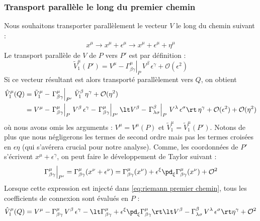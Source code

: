 \subsubsection{Transport parallèle le long du premier chemin}
Nous souhaitons transporter parallèlement le vecteur $V$ le long du chemin suivant :
\begin{align}
        x^\mu \rightarrow x^\mu+\epsilon^\mu \rightarrow  x^\mu + \epsilon^\mu + \eta^\mu
\end{align}
Le transport parallèle de $V$ de $P$ vers $P'$ est par définition :
\begin{equation}
    \tilde{V}^\mu_1 (P') = V^\mu - \left. \Gamma^\mu_{\beta \gamma}\right|_P \, V^\beta \, \epsilon^\gamma + \mathcal{O}(\epsilon^2)
\end{equation}
Si ce vecteur résultant est alors transporté parallèlement vers $Q$, on obtient 
\begin{align}
    \hat{V}^\mu_1 (Q) &= \tilde{V}^\mu_1 - \left. \Gamma^\mu_{\beta \gamma} \right|_{P'} \, \tilde{V}^\beta_1 \,  \eta^\gamma + \mathcal{O}(\eta^2)\\
    \label{eq:riemann premier chemin}
    & = V^\mu - \left. \Gamma^\mu_{\beta \gamma} \right|_P \, V^\beta \, \epsilon^\gamma - \left. \Gamma^\mu_{\beta \gamma} \right|_{P'} \lt V^\beta -\left. \Gamma^\beta_{\lambda \sigma}\right|_P \, V^\lambda \, \epsilon^\sigma \rt \, \eta^\gamma +  \mathcal{O}(\epsilon^2) + \mathcal{O}(\eta^2)
\end{align}
où nous avons omis les arguments : $V^\mu = V^\mu(P)$ et $\tilde{V}^\mu_1 = \tilde{V}^\mu_1 (P')$. Notons de plus que nous négligerons les termes de second ordre mais pas les termes croisées en $\epsilon \eta$ (qui s'avérera crucial pour notre analyse). Comme, les coordonnées de $P'$ s'écrivent $x^\mu + \epsilon^\gamma$, on peut faire le développement de Taylor suivant :
\begin{equation}
    \label{eq:taylor connexion}
    \left. \Gamma^\mu_{\beta \gamma} \right|_{P'} = \Gamma^\mu_{\beta \gamma} (x^\nu +\epsilon^\nu ) = \Gamma^\mu_{\beta \gamma} (x^\nu) + \epsilon^\xi \pd_\xi \Gamma^\mu_{\beta \gamma} (x^\nu) + \mathcal{O}^2
\end{equation}
Lorsque cette expression est injecté dans \ref{eq:riemann premier chemin}, tous les coefficients de connexion sont évalués en $P$ :
\begin{equation}
    \label{eq: premier chemin}
    \hat{V}^\mu_1 (Q) = V^\mu - \Gamma^\mu_{\beta \gamma}  \, V^\beta \, \epsilon^\gamma - \lt \Gamma^\mu_{\beta \gamma} + \epsilon^\xi \pd_\xi \Gamma^\mu_{\beta \gamma} \rt \lt V^\beta - \Gamma^\beta_{\lambda \sigma} \, V^\lambda \, \epsilon^\sigma \rt \eta^\gamma +  \mathcal{O}^2
\end{equation} 
